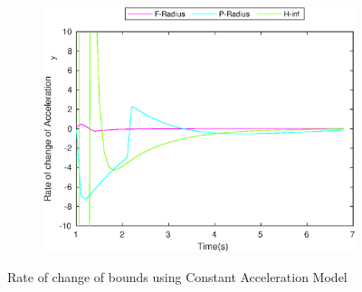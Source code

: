 \begin{figure}[h]
\begin{subfigure}{.5\linewidth}
\end{subfigure}
\begin{subfigure}{.5\linewidth}
\centering
\includegraphics[width=.9\linewidth]{figures/BoundChange/CA/ca_bound_changeAcceleration_y}
\end{subfigure}
\caption{Rate of change of bounds using Constant Acceleration Model}
\end{figure}


